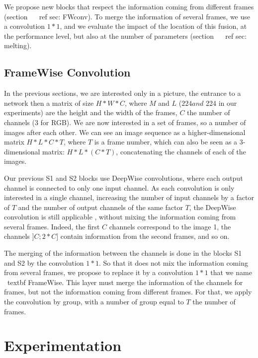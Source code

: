 \documentclass[letterpaper, 10 pt, conference]{ieeeconf}  %
\begin{document}
We propose new blocks that respect the information coming from different frames (section ~ \ ref {sec: FWconv}).
To merge the information of several frames, we use a convolution $ 1 * 1 $, and we evaluate the impact of the location of this fusion, at the performance level, but also at the number of parameters (section ~ \ ref {sec: melting}).



\subsection{FrameWise Convolution}
\label{sec:FWconv}

In the previous sections, we are interested only in a picture, the entrance to a network then a matrix of size $ H * W * C $, where $ M $ and $ L $ ($ 224 and $ 224 in our experiments) are the height and the width of the frames, $ C $ the number of channels (3 for RGB).
We are now interested in a set of frames, so a number of images after each other.
We can see an image sequence as a higher-dimensional matrix $ H * L * C * T $, where $ T $ is a frame number, which can also be seen as a 3-dimensional matrix: $ H * L * (C * T) $, concatenating the channels of each of the images.

Our previous S1 and S2 blocks use DeepWise convolutions, where each output channel is connected to only one input channel.
As each convolution is only interested in a single channel, increasing the number of input channels by a factor of $ T $ and the number of output channels of the same factor $ T $, the DeepWise convolution is still applicable , without mixing the information coming from several frames.
Indeed, the first $ C $ channels correspond to the image 1, the channels $] C; 2 * C] $ contain information from the second frames, and so on.

The merging of the information between the channels is done in the blocks S1 and S2 by the convolution $ 1 * 1 $.
So that it does not mix the information coming from several frames, we propose to replace it by a convolution $ 1 * 1 $ that we name \ textbf {FrameWise}.
This layer must merge the information of the channels for frames, but not the information coming from different frames.
For that, we apply the convolution by group, with a number of group equal to $ T $ the number of frames.



\section{Experimentation}
\end{document}
